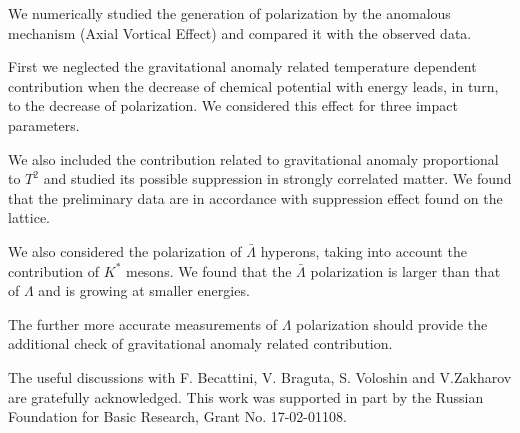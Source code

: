 \documentclass[preprint,aps,showpacs,nofootinbib,superscriptaddress,preprintnumbers,epsf,psf]{revtex4}
\begin{document}



We numerically studied the generation of polarization by the
anomalous mechanism (Axial Vortical Effect) and compared it with the
observed data.

First we neglected the gravitational anomaly related temperature
dependent contribution when the decrease of chemical potential with
energy leads, in turn, to the decrease of polarization. We considered
this effect for three impact parameters.

We also  included the contribution related to gravitational anomaly
proportional to $T^2$ and studied its possible suppression in
strongly correlated matter. We found that the preliminary data are
in accordance with suppression effect found on the lattice.

We also considered the polarization of $\bar \Lambda$ hyperons, taking into account 
the contribution of $K^*$ mesons. We found that the $\bar \Lambda$ polarization is larger than 
that of  $\Lambda$ and is growing at smaller energies.  


The further more accurate measurements of $\Lambda$ polarization
should provide the additional check of gravitational anomaly related
contribution.


%
The useful discussions with F. Becattini, V. Braguta, S. Voloshin and V.Zakharov are gratefully acknowledged.
This work was supported in part by the Russian Foundation for Basic
Research, Grant No. 17-02-01108.
\end{document}
